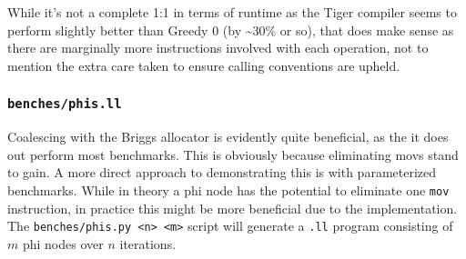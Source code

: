 \documentclass{article}
\begin{document}
\noindent While it's not a complete 1:1 in terms of runtime as the Tiger compiler seems to perform slightly better than Greedy 0 (by \textasciitilde 30\% or so), that does make sense as there are marginally more instructions involved with each operation, not to mention the extra care taken to ensure calling conventions are upheld.








\subsubsection{\lstinline!benches/phis.ll!}
Coalescing with the Briggs allocator is evidently quite beneficial, as the it does out perform most benchmarks. This is obviously because eliminating movs stand to gain. A more direct approach to demonstrating this is with parameterized benchmarks. While in theory a phi node has the potential to eliminate one \texttt{mov} instruction, in practice this might be more beneficial due to the implementation.
The \texttt{benches/phis.py <n> <m>} script will generate a \texttt{.ll} program consisting of \(m\) phi nodes over \(n\) iterations.
\end{document}
